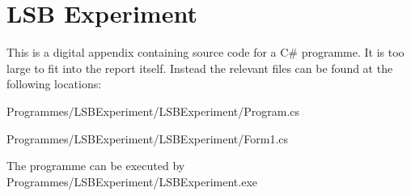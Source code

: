 \chapter{LSB Experiment}
\label{app:A}
This is a digital appendix containing source code for a C\# programme. It is too large to fit into the report itself.
Instead the relevant files can be found at the following locations:

Programmes/LSB\textunderscore Experiment/LSB\textunderscore Experiment/Program.cs

Programmes/LSB\textunderscore Experiment/LSB\textunderscore Experiment/Form1.cs

The programme can be executed by
Programmes/LSB\textunderscore Experiment/LSB\textunderscore Experiment.exe